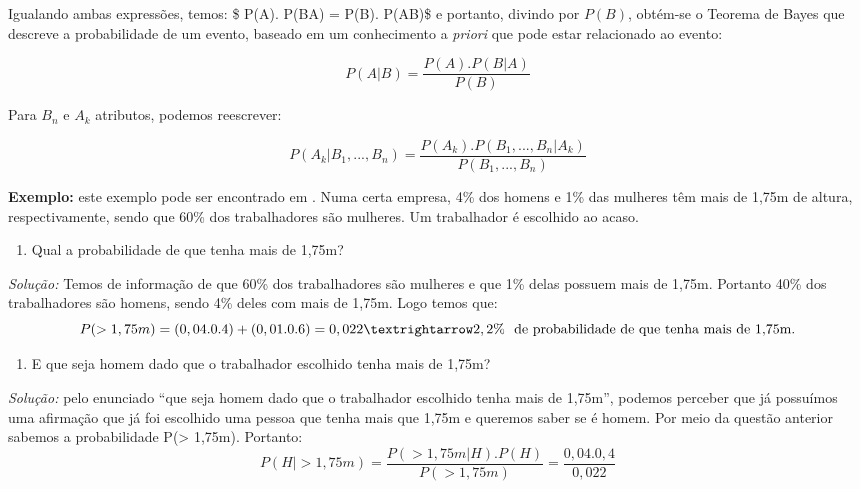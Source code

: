 \documentclass[
]{book}
\providecommand{\tightlist}{%
  \setlength{\itemsep}{0pt}\setlength{\parskip}{0pt}}
\begin{document}
Igualando ambas expressões, temos: \$ P(A). P(B\textbar{}A) = P(B). P(A\textbar{}B)\$ e portanto, divindo por \(P(B)\), obtém-se o Teorema de Bayes que descreve a probabilidade de um evento, baseado em um conhecimento a \emph{priori} que pode estar relacionado ao evento:

\begin{equation} 
 P(A|B) = \frac{P(A).P(B|A)}{P(B)}
  \label{eq:bayes}
\end{equation}

Para \(B_n\) e \(A_k\) atributos, podemos reescrever:

\begin{equation} 
 P(A_k|B_1,...,B_n) = \frac{P(A_k).P(B_1,...,B_n|A_k)}{P(B_1,...,B_n)}
  \label{eq:bayesn}
\end{equation}

\textbf{Exemplo:} este exemplo pode ser encontrado em \citet{freund2009estatistica}. Numa certa empresa, 4\% dos homens e 1\% das mulheres têm mais de 1,75m
de altura, respectivamente, sendo que 60\% dos trabalhadores são mulheres. Um trabalhador é escolhido ao acaso.

\begin{enumerate}
\def\labelenumi{\Alph{enumi})}
\tightlist
\item
  Qual a probabilidade de que tenha mais de 1,75m?
\end{enumerate}

\emph{Solução:} Temos de informação de que 60\% dos trabalhadores são mulheres e que 1\% delas possuem mais de 1,75m. Portanto 40\% dos trabalhadores são homens, sendo 4\% deles com mais de 1,75m. Logo temos que:
\[P(> 1, 75m) = (0, 04 . 0.4) + (0, 01 . 0.6) = 0, 022 \\ → 2, 2\% \ \mbox{ de probabilidade de que tenha mais de 1,75m.}\]

\begin{enumerate}
\def\labelenumi{\Alph{enumi})}
\setcounter{enumi}{1}
\tightlist
\item
  E que seja homem dado que o trabalhador escolhido tenha mais de 1,75m?
\end{enumerate}

\emph{Solução:} pelo enunciado ``que seja homem dado que o trabalhador escolhido tenha mais de 1,75m'', podemos perceber que já possuímos uma afirmação que já foi escolhido uma pessoa que tenha mais que 1,75m e queremos saber se é homem. Por meio da questão anterior sabemos a probabilidade P(\textgreater{} 1,75m). Portanto:
\[P(H| > 1, 75m) = \frac{P(> 1, 75m|H).P(H)}{P(> 1, 75m)}=\frac{0,04.0,4}{0, 022} \]
\end{document}
